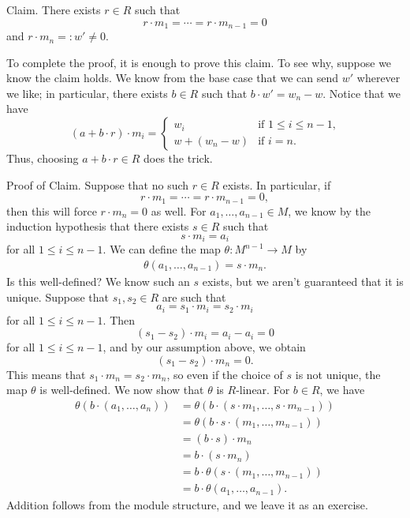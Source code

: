 \documentclass[10pt]{article}
\numberwithin{equation}{section}
\theoremstyle{newstyle}
\begin{document}
\begin{enumerate}[(1)]
    {\sc Claim.} There exists $r \in R$ such that 
    \[ r \cdot m_1 = \cdots = r \cdot m_{n-1} = 0 \]
    and $r \cdot m_n =: w' \neq 0$. 
    
    To complete the proof, it is enough to prove this claim. To see why, suppose we know the claim holds. 
    We know from the base case 
    that we can send $w'$ wherever we like; in particular, there exists $b \in R$ such that 
    $b \cdot w' = w_n - w$. Notice that we have 
    \[ (a + b \cdot r) \cdot m_i = \begin{cases}
    w_i & \text{if $1 \leq i \leq n-1$,} \\ w + (w_n - w) & \text{if $i = n$.} \end{cases} \]
    Thus, choosing $a + b \cdot r \in R$ does the trick.
    
    {\sc Proof of Claim.} Suppose that no such $r \in R$ exists. In particular, if 
    \[ r \cdot m_1 = \cdots = r \cdot m_{n-1} = 0, \]
    then this will force $r \cdot m_n = 0$ as well. For $a_1, \dots, a_{n-1} \in M$, we know by the induction hypothesis that there exists 
    $s \in R$ such that 
    \[ s \cdot m_i = a_i \]
    for all $1 \leq i \leq n-1$. We can define the map $\theta : M^{n-1} \to M$ by 
    \begin{align*}
        \theta(a_1, \dots, a_{n-1}) = s \cdot m_n. 
    \end{align*}  
    Is this well-defined? We know such an $s$ exists, but we aren't guaranteed that it is unique. 
    Suppose that $s_1, s_2 \in R$ are such that 
    \[ a_i = s_1 \cdot m_i = s_2 \cdot m_i \]
    for all $1 \leq i \leq n-1$. Then 
    \[ (s_1 - s_2) \cdot m_i = a_i - a_i = 0 \] 
    for all 
    $1 \leq i \leq n-1$, and by our assumption above, we obtain 
    \[ (s_1 - s_2) \cdot m_n = 0. \]
    This means that $s_1 \cdot m_n = s_2 \cdot m_n$, so even if the choice of $s$ is not unique, the 
    map $\theta$ is well-defined. We now show that $\theta$ is $R$-linear. For $b \in R$, we have 
    \begin{align*}
        \theta(b \cdot (a_1, \dots, a_n)) 
        &= \theta(b \cdot (s \cdot m_1, \dots, s \cdot m_{n-1})) \\
        &= \theta(b \cdot s \cdot (m_1, \dots, m_{n-1})) \\
        &= (b \cdot s) \cdot m_n \\
        &= b \cdot (s \cdot m_n) \\
        &= b \cdot \theta(s \cdot (m_1, \dots, m_{n-1})) \\
        &= b \cdot \theta(a_1, \dots, a_{n-1}).
    \end{align*}
    Addition follows from the module structure, and we leave it as an exercise.
    

\end{enumerate}
\end{document}

